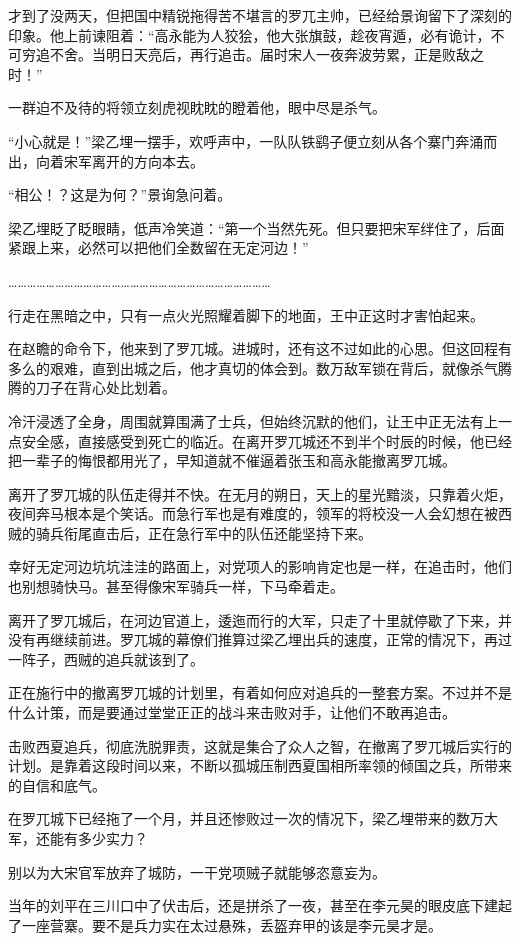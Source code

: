 才到了没两天，但把国中精锐拖得苦不堪言的罗兀主帅，已经给景询留下了深刻的印象。他上前谏阻着：“高永能为人狡狯，他大张旗鼓，趁夜宵遁，必有诡计，不可穷追不舍。当明日天亮后，再行追击。届时宋人一夜奔波劳累，正是败敌之时！”

一群迫不及待的将领立刻虎视眈眈的瞪着他，眼中尽是杀气。

“小心就是！”梁乙埋一摆手，欢呼声中，一队队铁鹞子便立刻从各个寨门奔涌而出，向着宋军离开的方向本去。

“相公！？这是为何？”景询急问着。

梁乙埋眨了眨眼睛，低声冷笑道：“第一个当然先死。但只要把宋军绊住了，后面紧跟上来，必然可以把他们全数留在无定河边！”

…………………………………………………………………………

行走在黑暗之中，只有一点火光照耀着脚下的地面，王中正这时才害怕起来。

在赵瞻的命令下，他来到了罗兀城。进城时，还有这不过如此的心思。但这回程有多么的艰难，直到出城之后，他才真切的体会到。数万敌军锁在背后，就像杀气腾腾的刀子在背心处比划着。

冷汗浸透了全身，周围就算围满了士兵，但始终沉默的他们，让王中正无法有上一点安全感，直接感受到死亡的临近。在离开罗兀城还不到半个时辰的时候，他已经把一辈子的悔恨都用光了，早知道就不催逼着张玉和高永能撤离罗兀城。

离开了罗兀城的队伍走得并不快。在无月的朔日，天上的星光黯淡，只靠着火炬，夜间奔马根本是个笑话。而急行军也是有难度的，领军的将校没一人会幻想在被西贼的骑兵衔尾直击后，正在急行军中的队伍还能坚持下来。

幸好无定河边坑坑洼洼的路面上，对党项人的影响肯定也是一样，在追击时，他们也别想骑快马。甚至得像宋军骑兵一样，下马牵着走。

离开了罗兀城后，在河边官道上，逶迤而行的大军，只走了十里就停歇了下来，并没有再继续前进。罗兀城的幕僚们推算过梁乙埋出兵的速度，正常的情况下，再过一阵子，西贼的追兵就该到了。

正在施行中的撤离罗兀城的计划里，有着如何应对追兵的一整套方案。不过并不是什么计策，而是要通过堂堂正正的战斗来击败对手，让他们不敢再追击。

击败西夏追兵，彻底洗脱罪责，这就是集合了众人之智，在撤离了罗兀城后实行的计划。是靠着这段时间以来，不断以孤城压制西夏国相所率领的倾国之兵，所带来的自信和底气。

在罗兀城下已经拖了一个月，并且还惨败过一次的情况下，梁乙埋带来的数万大军，还能有多少实力？

别以为大宋官军放弃了城防，一干党项贼子就能够恣意妄为。

当年的刘平在三川口中了伏击后，还是拼杀了一夜，甚至在李元昊的眼皮底下建起了一座营寨。要不是兵力实在太过悬殊，丢盔弃甲的该是李元昊才是。

